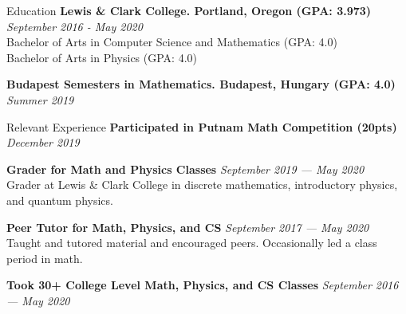 \documentclass{resume}
\begin{document}
\begin{rSection}{Education}
    \textbf{Lewis \& Clark College. Portland, Oregon (GPA: 3.973)} \hfill \textit{September 2016 - May 2020}\\
    Bachelor of Arts in Computer Science and Mathematics (GPA: 4.0)\\
    Bachelor of Arts in Physics (GPA: 4.0)
    
    \textbf{Budapest Semesters in Mathematics. Budapest, Hungary (GPA: 4.0)} \hfill \textit{Summer 2019}
\end{rSection}


\begin{rSection}{Relevant Experience}
\textbf{Participated in Putnam Math Competition (20pts)}
    \hfill \textit{December 2019} 

    \textbf{Grader for Math and Physics Classes} \hfill \textit{September 2019 --- May 2020}\\
   	Grader at Lewis \& Clark College in discrete mathematics, introductory physics, and quantum physics.
   	
    \textbf{Peer Tutor for Math, Physics, and CS} \hfill \textit{September 2017 --- May 2020}\\
    Taught and tutored material and encouraged peers. Occasionally led a class period in math.
   
    \textbf{Took 30+ College Level Math, Physics, and CS Classes}
    \hfill \textit{September 2016 --- May 2020}
\end{rSection}
\end{document}
